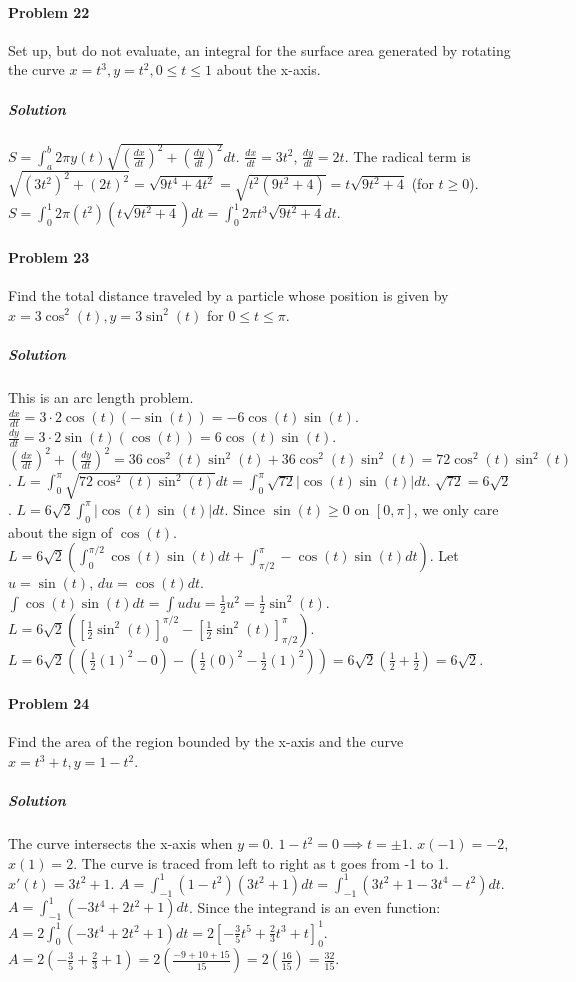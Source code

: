 \documentclass{article}
\begin{document}
\paragraph{Problem 22}
Set up, but do not evaluate, an integral for the surface area generated by rotating the curve $x=t^3, y=t^2, 0 \le t \le 1$ about the x-axis.

\subparagraph{Solution}
$S = \int_a^b 2\pi y(t) \sqrt{(\frac{dx}{dt})^2 + (\frac{dy}{dt})^2} dt$.
$\frac{dx}{dt} = 3t^2$, $\frac{dy}{dt} = 2t$.
The radical term is $\sqrt{(3t^2)^2+(2t)^2} = \sqrt{9t^4+4t^2} = \sqrt{t^2(9t^2+4)} = t\sqrt{9t^2+4}$ (for $t \ge 0$).
$S = \int_0^1 2\pi (t^2) (t\sqrt{9t^2+4}) dt = \int_0^1 2\pi t^3\sqrt{9t^2+4} dt$.

\paragraph{Problem 23}
Find the total distance traveled by a particle whose position is given by $x=3\cos^2(t), y=3\sin^2(t)$ for $0 \le t \le \pi$.

\subparagraph{Solution}
This is an arc length problem.
$\frac{dx}{dt} = 3 \cdot 2\cos(t)(-\sin(t)) = -6\cos(t)\sin(t)$.
$\frac{dy}{dt} = 3 \cdot 2\sin(t)(\cos(t)) = 6\cos(t)\sin(t)$.
$(\frac{dx}{dt})^2 + (\frac{dy}{dt})^2 = 36\cos^2(t)\sin^2(t) + 36\cos^2(t)\sin^2(t) = 72\cos^2(t)\sin^2(t)$.
$L = \int_0^\pi \sqrt{72\cos^2(t)\sin^2(t)} dt = \int_0^\pi \sqrt{72}|\cos(t)\sin(t)| dt$.
$\sqrt{72} = 6\sqrt{2}$.
$L = 6\sqrt{2} \int_0^\pi |\cos(t)\sin(t)| dt$.
Since $\sin(t) \ge 0$ on $[0,\pi]$, we only care about the sign of $\cos(t)$.
$L = 6\sqrt{2} \left( \int_0^{\pi/2} \cos(t)\sin(t) dt + \int_{\pi/2}^{\pi} -\cos(t)\sin(t) dt \right)$.
Let $u=\sin(t)$, $du=\cos(t)dt$.
$\int \cos(t)\sin(t)dt = \int u du = \frac{1}{2}u^2 = \frac{1}{2}\sin^2(t)$.
$L = 6\sqrt{2} \left( \left[\frac{1}{2}\sin^2(t)\right]_0^{\pi/2} - \left[\frac{1}{2}\sin^2(t)\right]_{\pi/2}^{\pi} \right)$.
$L = 6\sqrt{2} \left( (\frac{1}{2}(1)^2 - 0) - (\frac{1}{2}(0)^2 - \frac{1}{2}(1)^2) \right) = 6\sqrt{2}(\frac{1}{2} + \frac{1}{2}) = 6\sqrt{2}$.

\paragraph{Problem 24}
Find the area of the region bounded by the x-axis and the curve $x=t^3+t, y=1-t^2$.

\subparagraph{Solution}
The curve intersects the x-axis when $y=0$.
$1-t^2=0 \implies t = \pm 1$.
$x(-1) = -2$, $x(1) = 2$. The curve is traced from left to right as t goes from -1 to 1.
$x'(t) = 3t^2+1$.
$A = \int_{-1}^1 (1-t^2)(3t^2+1) dt = \int_{-1}^1 (3t^2+1-3t^4-t^2) dt$.
$A = \int_{-1}^1 (-3t^4+2t^2+1) dt$.
Since the integrand is an even function:
$A = 2 \int_0^1 (-3t^4+2t^2+1) dt = 2 \left[ -\frac{3}{5}t^5 + \frac{2}{3}t^3 + t \right]_0^1$.
$A = 2(-\frac{3}{5} + \frac{2}{3} + 1) = 2(\frac{-9+10+15}{15}) = 2(\frac{16}{15}) = \frac{32}{15}$.
\end{document}
